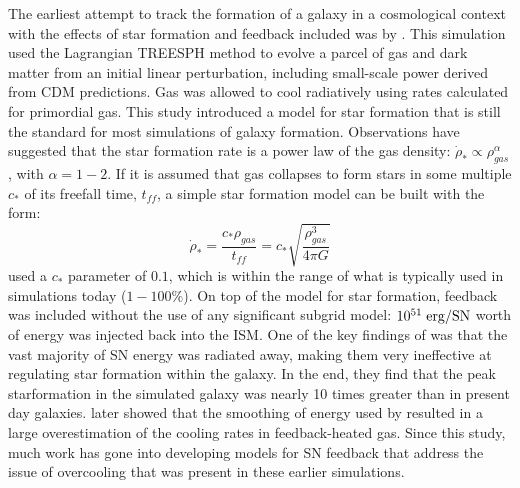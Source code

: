 The earliest attempt to track the formation of a galaxy in a cosmological
context with the effects of star formation and feedback included was by
\citep{Katz1992}.  This simulation used the Lagrangian TREESPH method
\citep{Hernquist1989} to evolve a parcel of gas and dark matter from an initial
linear perturbation, including small-scale power derived from CDM predictions.
Gas was allowed to cool radiatively using rates calculated for primordial gas.
This study introduced a model for star formation that is still the standard for
most simulations of galaxy formation.  Observations \citep{Schmidt1959} have
suggested that the star formation rate is a power law of the gas density:
$\dot\rho_*\propto\rho_{gas}^\alpha$, with $\alpha=1-2$.  If it is assumed that
gas collapses to form stars in some multiple $c_*$ of its freefall time,
$t_{ff}$, a simple star formation model can be built with the form:
\begin{equation}
    \dot\rho_* = \frac{c_*\rho_{gas}}{t_{ff}} = c_*\sqrt{\frac{\rho^3_{gas}}{4\pi G}}
\end{equation}
\citet{Katz1992} used a $c_*$ parameter of $0.1$, which is within the range of
what is typically used in simulations today ($1-100\%$).  On top of the model
for star formation, feedback was included without the use of any significant
subgrid model:  $10^{51}\;\rm{erg/SN}$ worth of energy was injected back into
the ISM.  One of the key findings of \citet{Katz1992} was that the vast majority
of SN energy was radiated away, making them very ineffective at regulating star
formation within the galaxy.  In the end, they find that the peak starformation
in the simulated galaxy was nearly 10 times greater than in present day
galaxies.  \citet{Thacker2000} later showed that the smoothing of energy used by
\citet{Katz1992} resulted in a large overestimation of the cooling rates in
feedback-heated gas. Since this study, much work has gone into developing models
for SN feedback that address the issue of overcooling that was present in these
earlier simulations.

